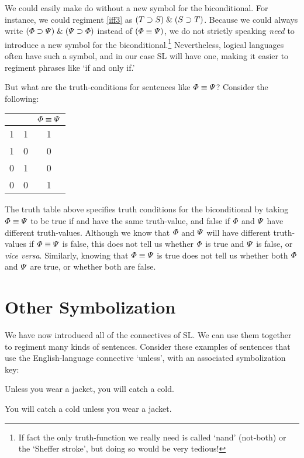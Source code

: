 We could easily make do without a new symbol for the biconditional.
For instance, we could regiment \ref{iff3} as $(T \supset S)\mathrel\&(S\supset T)$.
Because we could always write $(\varPhi{}\supset\varPsi{})\mathrel\&(\varPsi{}\supset\varPhi{})$ instead of $(\varPhi{}\equiv\varPsi{})$, we do not strictly speaking \emph{need} to introduce a new symbol for the biconditional.\footnote{If fact the only truth-function we really need is called `nand' (not-both) or the `Sheffer stroke', but doing so would be very tedious!} 
Nevertheless, logical languages often have such a symbol, and in our case SL will have one, making it easier to regiment phrases like `if and only if.'

But what are the truth-conditions for sentences like $\varPhi\equiv\varPsi$? 
Consider the following:

\begin{center}
\begin{tabular}{c|c|c}
\metaA{} & \metaB{} & $\varPhi{}\equiv\varPsi{}$\\
\hline
1 & 1 & 1\\
1 & 0 & 0\\
0 & 1 & 0\\
0 & 0 & 1
\end{tabular}
\end{center}

The truth table above specifies truth conditions for the biconditional by taking $\varPhi{} \equiv \varPsi{}$ to be true if \metaA{} and \metaB{} have the same truth-value, and false if $\varPhi{}$ and $\varPsi{}$ have different truth-values.
Although we know that $\varPhi{}$ and $\varPsi{}$ will have different truth-values if $\varPhi{} \equiv \varPsi{}$ is false, this does not tell us whether $\varPhi{}$ is true and $\varPsi{}$ is false, or \textit{vice versa}.
Similarly, knowing that $\varPhi \equiv \varPsi$ is true does not tell us whether both $\varPhi$ and $\varPsi$ are true, or whether both are false. 



\section{Other Symbolization}
We have now introduced all of the connectives of SL.
We can use them together to regiment many kinds of sentences.
Consider these examples of sentences that use the English-language connective `unless', with an associated symbolization key:

\begin{earg}
\item[\ex{unless1}] Unless you wear a jacket, you will catch a cold. 
\item[\ex{unless2}] You will catch a cold unless you wear a jacket. 
\end{earg}


